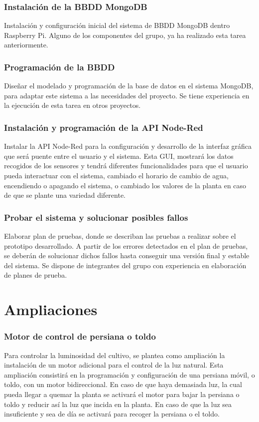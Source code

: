 \documentclass[12pt,a4paper,titlepage,oneside]{report}
\begin{document}
	\subsection*{Instalación de la BBDD MongoDB}
	Instalación y configuración inicial del sistema de BBDD MongoDB dentro  Raspberry Pi. Alguno de los componentes del grupo, ya ha realizado esta tarea anteriormente.
	
	\subsection*{Programación de la BBDD}
	Diseñar el modelado y programación de la base de datos en el sistema MongoDB, para adaptar este sistema a las necesidades del proyecto. Se tiene experiencia en la ejecución de esta tarea en otros proyectos.
	
	\subsection*{Instalación y programación de la API Node-Red}
	Instalar la API Node-Red para la configuración y desarrollo de la interfaz gráfica que será puente entre el usuario y el sistema. Esta GUI, mostrará los datos recogidos de los sensores y tendrá diferentes funcionalidades para que el usuario pueda interactuar con el sistema, cambiado el horario de cambio de agua, encendiendo o apagando el sistema, o cambiado los valores de la planta en caso de que se plante una variedad diferente.
	
	\subsection*{Probar el sistema y solucionar posibles fallos}
	Elaborar plan de pruebas, donde se describan las pruebas a realizar sobre el prototipo desarrollado. A partir de los errores detectados en el plan de pruebas, se deberán de solucionar dichos fallos hasta conseguir una versión final y estable del sistema.
Se dispone de integrantes del grupo con experiencia en elaboración de planes de prueba.
	

\chapter{Ampliaciones}

	\subsection*{Motor de control de persiana o toldo}
	Para controlar la luminosidad del cultivo, se plantea como ampliación la instalación de un motor adicional para el control de la luz natural. Esta ampliación consistirá en la programación y configuración de una persiana móvil, o toldo, con un motor bidireccional. En caso de que haya demasiada luz, la cual pueda llegar a quemar la planta se activará el motor para bajar la persiana o toldo y reducir así la luz que incida en la planta. En caso de que la luz sea insuficiente y sea de día se activará para recoger la persiana o el toldo.
	
\end{document}

